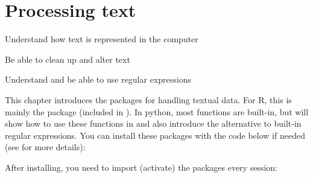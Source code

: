 \chapter{Processing text}
\label{chap:protext}


\begin{abstract}{Abstract}
Many data sets that are relevant for social science consist of textual data, from political discussions and newspaper archives to open-ended survey questions and reviews. This chapter gives an introduction in dealing with textual data using base functions in Python and (mostly) the  package in R. 
\end{abstract}


\begin{objectives}
\item Understand how text is represented in the computer
\item Be able to clean up and alter text
\item Understand and be able to use regular expressions 
\end{objectives}


\newpage
\begin{feature}
  This chapter introduces the packages for handling textual data.
  For R, this is mainly the  package (included in \tidyverse).
  In python, most functions are built-in, but will show how to use these functions in  and also introduce the  alternative to built-in regular expressions.
You can install these packages with the code below if needed  (see  for more details):


\noindent After installing, you need to import (activate) the packages every session:


\end{feature}







